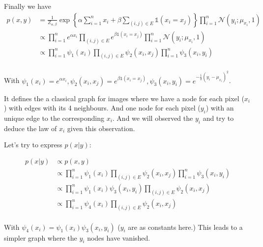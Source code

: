 \documentclass{article}
\begin{document}
Finally we have
\begin{equation*}
    \begin{aligned}
        p(x, y) & = \frac{1}{Z_{\alpha, \beta}} \exp\left\{ \alpha \sum_{i=1}^nx_i + \beta \sum_{(i,j) \in E} \mathds{1}(x_i = x_j)\right\}\prod_{i=1}^n\mathcal{N}(y_i; \mu_{x_i}, 1) \\
                & \propto \prod_{i=1}^ne^{\alpha x_i} \prod_{(i, j) \in E}e^{\beta \mathds{1}(x_i = x_j)}\prod_{i=1}^n\mathcal{N}(y_i; \mu_{x_i}, 1)                                   \\
                & \propto \prod_{i=1}^n \psi_1(x_i) \prod_{(i, j) \in E} \psi_2(x_i, x_j) \prod_{i=1}^n \psi_3(x_i, y_i)                                                               \\
    \end{aligned}
\end{equation*}

With $\psi_1(x_i) = e^{\alpha x_i}, \psi_2(x_i, x_j) = e^{\beta \mathds{1}(x_i = x_j)}, \psi_3(x_i, y_i) = e^{-\frac{1}{2}(y_i-\mu_{x_i})^2}$.

It defines the a classical graph for images where we have a node for each pixel ($x_i$) with edges with its
4 neighbours. And one node for each pixel ($y_i$) with an unique edge to the corresponding $x_i$. And we will observed the $y_i$ and try to deduce
the law of $x_i$ given this observation.

Let's try to express $p(x|y)$:

\begin{equation*}
    \begin{aligned}
        p(x| y) & \propto p(x, y)                                                                                        \\
                & \propto \prod_{i=1}^n \psi_1(x_i) \prod_{(i, j) \in E} \psi_2(x_i, x_j) \prod_{i=1}^n \psi_3(x_i, y_i) \\
                & \propto \prod_{i=1}^n \psi_1(x_i) \psi_3(x_i, y_i) \prod_{(i, j) \in E} \psi_2(x_i, x_j)               \\
                & \propto \prod_{i=1}^n \psi_4(x_i) \prod_{(i, j) \in E} \psi_2(x_i, x_j)                                \\
    \end{aligned}
\end{equation*}

With $\psi_4(x_i) = \psi_1(x_i)\psi_3(x_i, y_i)$ ($y_i$ are as constants here.) This leads to a simpler graph where the $y_i$ nodes have vanished.
\end{document}
